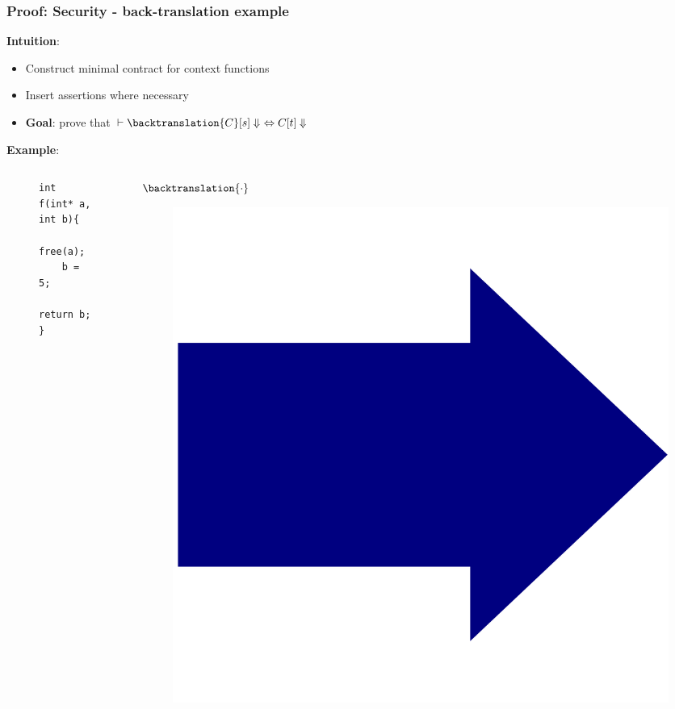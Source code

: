 \documentclass{beamer}
\begin{document}

\begin{frame}[fragile]
\frametitle{Proof: Security - back-translation example}
\textbf{Intuition}:\\
\begin{itemize}
\item Construct minimal contract for context functions\\
\item Insert assertions where necessary\\
\item \textbf{Goal}: prove that $\vdash \backtranslation{C}[s] \Downarrow\ \Leftrightarrow C[t] \Downarrow $

\end{itemize}

\textbf{Example}:\\
\begin{columns}
\begin{column}{0.4\textwidth}

\begin{figure}[h]
  \centering
\begin{lstlisting}[style=CStyleNoNum, captionpos = t,title = Target]
int f(int* a, int b){
	free(a);
	b = 5; 
	return b;
}
\end{lstlisting}
\end{figure}
	
\end{column}

\begin{column}{0.08\textwidth}

	{\large$\backtranslation{\cdot}$}\\\vspace{-1em}
	\begin{figure}
	\includegraphics[width=0.8\linewidth]{BlueArrow}
	\end{figure}


\end{column}
\end{columns}
\end{frame}
\end{document}
